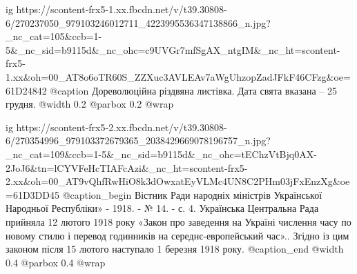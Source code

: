  
 
 
 
 

\ifcmt
  ig https://scontent-frx5-1.xx.fbcdn.net/v/t39.30808-6/270237050_979103246012711_4223995536347138866_n.jpg?_nc_cat=105&ccb=1-5&_nc_sid=b9115d&_nc_ohc=c9UVGr7mfSgAX_ntgIM&_nc_ht=scontent-frx5-1.xx&oh=00_AT8o6oTR60S_ZZXuc3AVLEAv7aWgUhzopZadJFkF46CFzg&oe=61D24842
  @caption Дореволюційна різдвяна листівка. Дата свята вказана – 25 грудня.
  @width 0.2
	@parbox 0.2
  @wrap \parpic[r]
\fi

\ifcmt
  ig https://scontent-frx5-2.xx.fbcdn.net/v/t39.30808-6/270354996_979103372679365_2038429669078196757_n.jpg?_nc_cat=109&ccb=1-5&_nc_sid=b9115d&_nc_ohc=tEChzVtBjq0AX-2JoJ6&tn=lCYVFeHcTIAFcAzi&_nc_ht=scontent-frx5-2.xx&oh=00_AT9vQhfRwHiO8k3dOwxatEyVLMc4UN8C2PHm03jFxEnzXg&oe=61D3DD45
  @caption_begin 
		Вістник Ради народніх міністрів Української Народньої Республіки» - 1918. -
		№ 14. - с. 4.  Українська Центральна Рада прийняла 12 лютого 1918 року
		«Закон про заведення на Україні числення часу по новому стилю і перевод
		годинників на середнє-европейський час»..  Згідно із цим законом після 15
		лютого наступало 1 березня 1918 року.
  @caption_end 
  @width 0.4
  @parbox 0.4
  @wrap \parpic[l]
\fi
